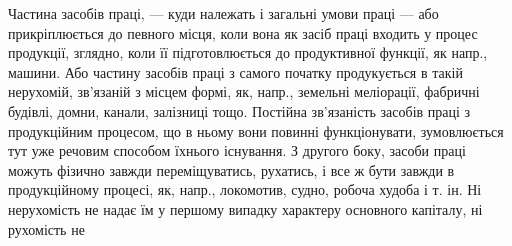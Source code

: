 Частина засобів праці, — куди належать і загальні умови праці — або
прикріплюється до певного місця, коли вона як засіб праці входить у процес
продукції, зглядно, коли її підготовлюється до продуктивної функції, як
напр., машини. Або частину засобів праці з самого початку продукується
в такій нерухомій, зв’язаній з місцем формі, як, напр., земельні
меліорації, фабричні будівлі, домни, канали, залізниці тощо. Постійна
зв’язаність засобів праці з продукційним процесом, що в ньому вони
повинні функціонувати, зумовлюється тут уже речовим способом їхнього
існування. З другого боку, засоби праці можуть фізично завжди переміщуватись,
рухатись, і все ж бути завжди в продукційному процесі, як,
напр., локомотив, судно, робоча худоба і т. ін. Ні нерухомість не надає
їм у першому випадку характеру основного капіталу, ні рухомість не
\parbreak{}  %
